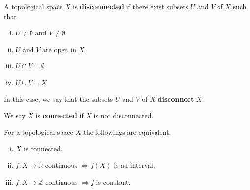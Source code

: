 \documentclass[a4paper]{article}
\begin{document}
\begin{definition}
    A topological space $X$ is \textbf{disconnected} if there exist subsets $U$ and $V$ of $X$ such that

    \begin{enumerate}[(i)]
    \item $U \neq \emptyset$ and $V \neq \emptyset$

    \item $U$ and $V$ are open in $X$

    \item $U \cap V=\emptyset$

    \item $U \cup V=X$

    \end{enumerate}

    In this case, we say that the subsets $U$ and $V$ of $X$ \textbf{disconnect} $X$.

    We say $X$ is \textbf{connected} if $X$ is not disconnected.
\end{definition}

\begin{theorem}\label{thm:connected tfae}
    For a topological space $X$ the followings are equivalent.
    \begin{enumerate}[(i)]
        \item $X$ is connected.
        \item $f: X \rightarrow \mathbb{R}$ continuous $\Longrightarrow f(X)$ is an interval.
        \item $f: X \rightarrow \mathbb{Z}$ continuous $\Longrightarrow f$ is constant.
    \end{enumerate}
\end{theorem}
\end{document}
